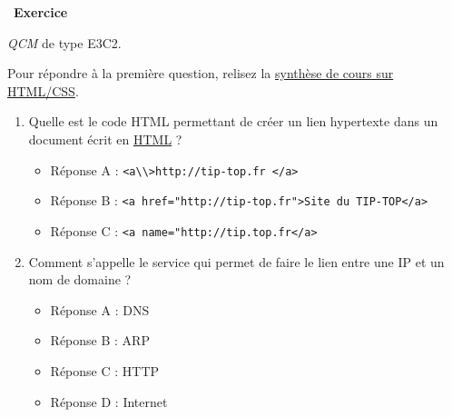 \documentclass[
  11pt,
]{article}
\newcommand{\passthrough}[1]{#1}
\providecommand{\tightlist}{%
  \setlength{\itemsep}{0pt}\setlength{\parskip}{0pt}}
\newcounter{exo}
\newenvironment{exercice}[1]
{\par \medskip   \addtocounter{exo}{1} \noindent  
\begin{bclogo}[arrondi =0.1,   noborder = true, logo=\bccrayon, marge=4]{~\textbf{Exercice} \textbf{\theexo} {\itshape #1} }  \par}
{
\end{bclogo}
 \par \bigskip }
\newcounter{def}
\newcounter{cours}
\begin{document}
\begin{exercice}{}

\emph{QCM} de type E3C2.

Pour répondre à la première question, relisez la
\href{https://parc-nsi.github.io/premiere-nsi/chapitre2/memo/MemoHTML-CSS-2020.pdf}{synthèse
de cours sur HTML/CSS}.

\begin{enumerate}
\def\labelenumi{\arabic{enumi}.}
\tightlist
\item
  Quelle est le code HTML permettant de créer un lien hypertexte dans un
  document écrit en
  \href{https://developer.mozilla.org/fr/docs/Glossaire/HTML}{HTML} ?

  \begin{itemize}
  \tightlist
  \item
    Réponse A : \passthrough{\lstinline!<a\\>http://tip-top.fr </a>!}
  \item
    Réponse B :
    \passthrough{\lstinline!<a href="http://tip-top.fr">Site du TIP-TOP</a>!}
  \item
    Réponse C : \passthrough{\lstinline!<a name="http://tip.top.fr</a>!}
  \end{itemize}
\item
  Comment s'appelle le service qui permet de faire le lien entre une IP
  et un nom de domaine ?

  \begin{itemize}
  \tightlist
  \item
    Réponse A : DNS
  \item
    Réponse B : ARP
  \item
    Réponse C : HTTP
  \item
    Réponse D : Internet
  \end{itemize}
\end{enumerate}

\end{exercice}
\end{document}
